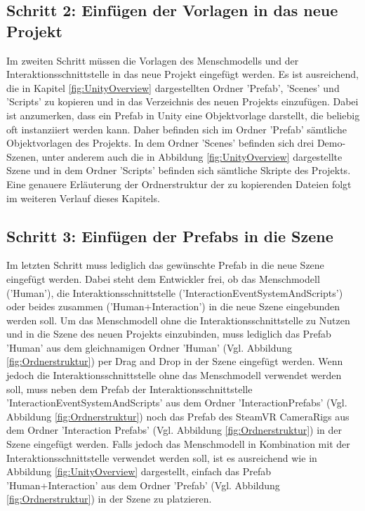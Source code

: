 \subsection{Schritt 2: Einfügen der Vorlagen in das neue Projekt}\label{sec:MenschmodellEinbinden2}
Im zweiten Schritt müssen die Vorlagen des Menschmodells und der Interaktionsschnittstelle in das neue Projekt eingefügt werden. Es ist ausreichend, die in Kapitel \ref{fig:UnityOverview} dargestellten Ordner 'Prefab', 'Scenes' und 'Scripts' zu kopieren und in das Verzeichnis des neuen Projekts einzufügen. Dabei ist anzumerken, dass ein Prefab in Unity eine Objektvorlage darstellt, die beliebig oft instanziiert werden kann. Daher befinden sich im Ordner 'Prefab' sämtliche Objektvorlagen des Projekts. In dem Ordner 'Scenes' befinden sich drei Demo-Szenen, unter anderem auch die in Abbildung \ref{fig:UnityOverview} dargestellte Szene und in dem Ordner 'Scripts' befinden sich sämtliche Skripte des Projekts. Eine genauere Erläuterung der Ordnerstruktur der zu kopierenden Dateien folgt im weiteren Verlauf dieses Kapitels.

\subsection{Schritt 3: Einfügen der Prefabs in die Szene}\label{sec:MenschmodellEinbinden3}
Im letzten Schritt muss lediglich das gewünschte Prefab in die neue Szene eingefügt werden. Dabei steht dem Entwickler frei, ob das Menschmodell ('Human'), die Interaktionsschnittstelle ('InteractionEventSystemAndScripts') oder beides zusammen ('Human+Interaction') in die neue Szene eingebunden werden soll. Um das Menschmodell ohne die Interaktionsschnittstelle zu Nutzen und in die Szene des neuen Projekts einzubinden, muss lediglich das Prefab 'Human' aus dem gleichnamigen Ordner 'Human' (Vgl. Abbildung \ref{fig:Ordnerstruktur}) per Drag and Drop in der Szene eingefügt werden. Wenn jedoch die Interaktionsschnittstelle ohne das Menschmodell verwendet werden soll, muss neben dem Prefab der Interaktionsschnittstelle 'InteractionEventSystemAndScripts' aus dem Ordner 'InteractionPrefabs' (Vgl. Abbildung \ref{fig:Ordnerstruktur}) noch das Prefab des SteamVR CameraRigs aus dem Ordner 'Interaction Prefabs' (Vgl. Abbildung \ref{fig:Ordnerstruktur}) in der Szene eingefügt werden. Falls jedoch das Menschmodell in Kombination mit der Interaktionsschnittstelle verwendet werden soll, ist es ausreichend wie in Abbildung \ref{fig:UnityOverview} dargestellt, einfach das Prefab 'Human+Interaction' aus dem Ordner 'Prefab' (Vgl. Abbildung \ref{fig:Ordnerstruktur}) in der Szene zu platzieren.

